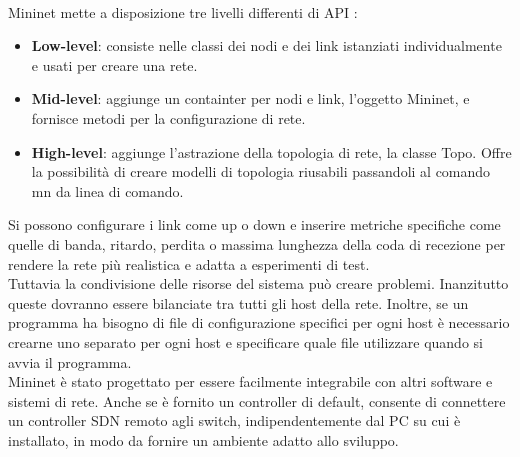 \\Mininet mette a disposizione tre livelli differenti di API \cite{introMin}:
\begin{itemize}
\item \textbf{Low-level}: consiste nelle classi dei nodi e dei link istanziati individualmente e usati per creare una rete.
\item \textbf{Mid-level}: aggiunge un containter per nodi e link, l'oggetto Mininet, e fornisce metodi per la configurazione di rete.
\item \textbf{High-level}: aggiunge l'astrazione della topologia di rete, la classe Topo. Offre la possibilità di creare modelli di topologia riusabili passandoli al comando mn da linea di comando.
\end{itemize}
Si possono configurare i link come up o down e inserire metriche specifiche 
come quelle di banda, ritardo, perdita o massima lunghezza della coda di recezione per rendere la rete più realistica e adatta a esperimenti di test.
\\Tuttavia la condivisione delle risorse del sistema può creare problemi.
Inanzitutto queste dovranno essere bilanciate tra tutti gli host della rete.
Inoltre, se un programma ha bisogno di file di configurazione specifici per ogni host è necessario crearne uno separato per ogni host e specificare quale file utilizzare quando si avvia il programma.
\\Mininet è stato progettato per essere facilmente integrabile con altri software e sistemi di rete.
Anche se è fornito un controller di default, consente di connettere un controller SDN remoto agli switch, indipendentemente dal PC su cui è installato, 
in modo da fornire un ambiente adatto allo sviluppo.

